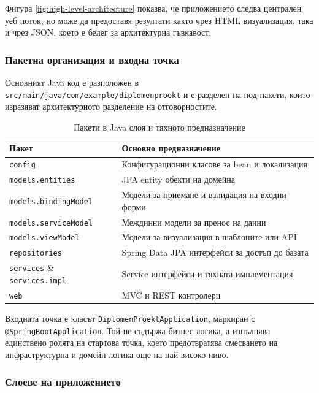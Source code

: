 Фигура \ref{fig:high-level-architecture} показва, че приложението следва централен уеб поток, но може да предоставя резултати както чрез HTML визуализация, така и чрез JSON, което е белег за архитектурна гъвкавост.

\subsubsection{Пакетна организация и входна точка}

Основният Java код е разположен в \texttt{src/main/java/com/example/diplomenproekt} и е разделен на под-пакети, които изразяват архитектурното разделение на отговорностите.

\begin{table}[H]
    \centering
    \caption{Пакети в Java слоя и тяхното предназначение}
    \label{tab:package-organization}
    \begin{tabularx}{\textwidth}{L{3.5cm}Y}
        \toprule
        Пакет & Основно предназначение \\
        \midrule
        \texttt{config} & Конфигурационни класове за bean и локализация \\
        \texttt{models.entities} & JPA entity обекти на домейна \\
        \texttt{models.bindingModel} & Модели за приемане и валидация на входни форми \\
        \texttt{models.serviceModel} & Междинни модели за пренос на данни \\
        \texttt{models.viewModel} & Модели за визуализация в шаблоните или API \\
        \texttt{repositories} & Spring Data JPA интерфейси за достъп до базата \\
        \texttt{services} \& \texttt{services.impl} & Service интерфейси и тяхната имплементация \\
        \texttt{web} & MVC и REST контролери \\
        \bottomrule
    \end{tabularx}
\end{table}

Входната точка е класът \texttt{DiplomenProektApplication}, маркиран с \texttt{@SpringBootApplication}. Той не съдържа бизнес логика, а изпълнява единствено ролята на стартова точка, което предотвратява смесването на инфраструктурна и домейн логика още на най-високо ниво.

\subsubsection{Слоеве на приложението}

